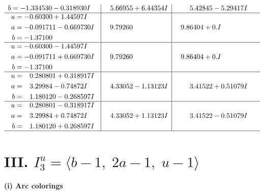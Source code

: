 \documentclass[1p]{elsarticle_modified}
\theoremstyle{definition}
\begin{document}
$$\begin{array}{c|c|c}
\begin{aligned}
b &= -1.334530 - 0.318930 I\end{aligned}
 & \phantom{-}5.66955 + 6.44354 I & \phantom{-}5.42845 - 5.29417 I \\ \hline\begin{aligned}
u &= -0.60300 + 1.44597 I \\
a &= -0.091711 - 0.669730 I \\
b &= -1.37100\phantom{ +0.000000I}\end{aligned}
 & \phantom{-}9.79260\phantom{ +0.000000I} & \phantom{-}9.86404 + 0. I\phantom{ +0.000000I} \\ \hline\begin{aligned}
u &= -0.60300 - 1.44597 I \\
a &= -0.091711 + 0.669730 I \\
b &= -1.37100\phantom{ +0.000000I}\end{aligned}
 & \phantom{-}9.79260\phantom{ +0.000000I} & \phantom{-}9.86404 + 0. I\phantom{ +0.000000I} \\ \hline\begin{aligned}
u &= \phantom{-}0.280801 + 0.318917 I \\
a &= \phantom{-}3.29984 - 0.74872 I \\
b &= \phantom{-}1.180120 - 0.268597 I\end{aligned}
 & \phantom{-}4.33052 - 1.13123 I & \phantom{-}3.41522 + 0.51079 I \\ \hline\begin{aligned}
u &= \phantom{-}0.280801 - 0.318917 I \\
a &= \phantom{-}3.29984 + 0.74872 I \\
b &= \phantom{-}1.180120 + 0.268597 I\end{aligned}
 & \phantom{-}4.33052 + 1.13123 I & \phantom{-}3.41522 - 0.51079 I\\
 \hline 
 \end{array}$$\newpage\newpage\renewcommand{\arraystretch}{1}
\centering \section*{III. $I^u_{3}= \langle b-1,\;2 a-1,\;u-1 \rangle$}
\flushleft \textbf{(i) Arc colorings}\\
\end{document}
